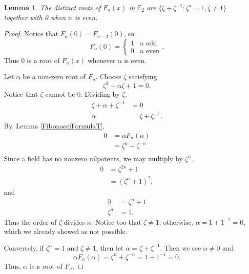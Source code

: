 \documentclass[a4paper]{article}
\newtheorem{lemma}[theorem]{Lemma}
\newcommand{\F}{\mathbb{F}}
\begin{document}
	\begin{lemma}\label{RootParameterization}
		The distinct roots of $F_n(x)$ in $\overline{\F_2}$ are $\{\zeta + \zeta^{-1} : \zeta^{n} = 1, \zeta \neq 1\}$ together with 0 when $n$ is even.
	\end{lemma}
	\begin{proof}
		Notice that $F_n(0) = F_{n-2}(0)$, so
		\begin{equation*}
			F_n(0) = \begin{cases}
				1 & n \text{ odd} \\
				0 & n \text{ even}
			\end{cases}.
		\end{equation*}
		Thus 0 is a root of $F_n(x)$ whenever $n$ is even.
		
		Let $\alpha$ be a non-zero root of $F_n$.
		Choose $\zeta$ satisfying
		\begin{equation*}
			\zeta^2 + \alpha\zeta + 1 = 0.
		\end{equation*}
		Notice that $\zeta$ cannot be 0.
		Dividing by $\zeta$,
		\begin{align*}
			\zeta + \alpha + \zeta^{-1} &= 0 \\
			\alpha &= \zeta + \zeta^{-1}.
		\end{align*}
		By, Lemma \ref{FibonacciFormulaT},
		\begin{align*}
			0 &= \alpha F_n(\alpha) \\
			&= \zeta^{n} + \zeta^{-n} \\
		\end{align*}
		Since a field has no nonzero nilpotents, we may multiply by $\zeta^n$.
		\begin{align*}
			0 &= \zeta^{2n} + 1 \\
			&= \left(\zeta^{n}+1\right)^2,
		\end{align*}
		and
		\begin{align*}
			0 &= \zeta^{n} + 1 \\
			\zeta^{n} &= 1.
		\end{align*}
		Thus the order of $\zeta$ divides $n$.
		Notice too that $\zeta \neq 1$; otherwise, $\alpha = 1 + 1^{-1} = 0$, which we already showed as not possible.
		
		Conversely, if $\zeta^{n} = 1$ and $\zeta \neq 1$, then let $\alpha = \zeta + \zeta^{-1}$.
		Then we see $\alpha \neq 0$ and
		\begin{equation*}
			\alpha F_n(\alpha) = \zeta^{n} + \zeta^{-n} = 1 + 1^{-1} = 0.
		\end{equation*}
		Thus, $\alpha$ is a root of $F_n$.
	\end{proof}
\end{document}
